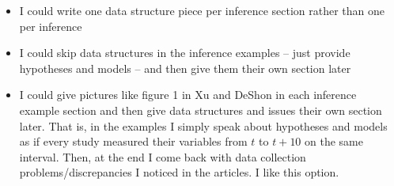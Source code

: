 \documentclass[]{article}
\begin{document}
\begin{enumerate}
\begin{itemize}
    \begin{itemize}
    \item
      I could write one data structure piece per inference section
      rather than one per inference
    \item
      I could skip data structures in the inference examples -- just
      provide hypotheses and models -- and then give them their own
      section later
    \item
      I could give pictures like figure 1 in Xu and DeShon in each
      inference example section and then give data structures and issues
      their own section later. That is, in the examples I simply speak
      about hypotheses and models as if every study measured their
      variables from \(t\) to \(t + 10\) on the same interval. Then, at
      the end I come back with data collection problems/discrepancies I
      noticed in the articles. I like this option.
    \end{itemize}
  \end{itemize}
\end{enumerate}
\end{document}
